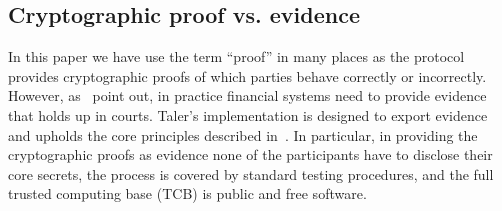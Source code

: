 \documentclass{llncs}
\begin{document}
%
%

\subsection{Cryptographic proof vs. evidence}

In this paper we have use the term ``proof'' in many places as the
protocol provides cryptographic proofs of which parties behave
correctly or incorrectly. However, as~\cite{fc2014murdoch} point out,
in practice financial systems need to provide evidence that holds up
in courts.  Taler's implementation is designed to export evidence and
upholds the core principles described in~\cite{fc2014murdoch}.  In
particular, in providing the cryptographic proofs as evidence none of
the participants have to disclose their core secrets, the process is
covered by standard testing procedures, and the full trusted
computing base (TCB) is public and free software.

%


\end{document}
